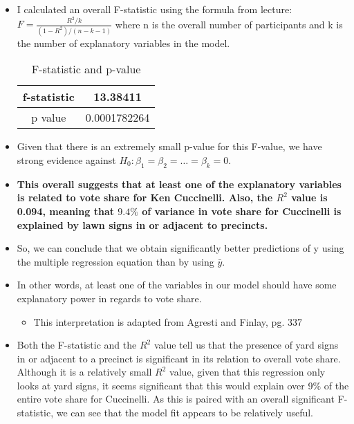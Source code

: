\documentclass[12pt,letterpaper]{article}
\begin{document}
\begin{enumerate}
	
\begin{itemize}
	\item I calculated an overall F-statistic using the formula from lecture:
	\large $ F = \frac{R^2 / k}{(1 - R^2) / (n - k - 1)}$
	\newline \normalsize where n is the overall number of participants and k is the number of explanatory variables in the model.
	\newline 
	
	\begin{table}[h]
		\centering
		\begin{tabular}{|c|c|}
			\hline
			f-statistic & 13.38411 \\
			\hline
			p value & 0.0001782264 \\
			\hline
		\end{tabular}
		\caption{F-statistic and p-value}
	\end{table}
	
	\item Given that there is an extremely small p-value for this F-value, we have strong evidence against $H_0:  \beta_1 = \beta_2 = \ldots = \beta_k = 0$. 
	\item \textbf{This overall suggests that at least one of the explanatory variables is related to vote share for Ken Cuccinelli. Also, the $R^2$ value is 0.094, meaning that $9.4\%$ of variance in vote share for Cuccinelli is explained by lawn signs in or adjacent to precincts. }
	\item So, we can conclude that we obtain significantly better predictions of y using the multiple regression equation than by using $\bar{y}$.
	\item In other words, at least one of the variables in our model should have some explanatory power in regards to vote share.
		\begin{itemize}
			\item \scriptsize This interpretation is adapted from Agresti and Finlay, pg. 337
		\end{itemize}
	\item Both the F-statistic and the $R^2$ value tell us that the presence of yard signs in or adjacent to a precinct is significant in its relation to overall vote share. Although it is a relatively small $R^2$ value, given that this regression only looks at yard signs, it seems significant that this would explain over 9$\%$ of the entire vote share for Cuccinelli. As this is paired with an overall significant F-statistic, we can see that the model fit appears to be relatively useful.

	
\end{itemize}
\end{enumerate}  
\end{document}
